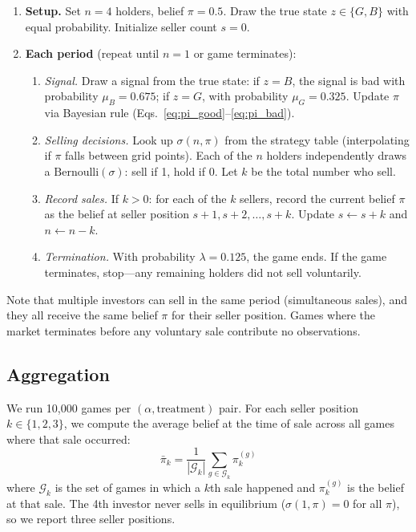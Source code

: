 \documentclass[11pt]{article}
\begin{document}
\begin{enumerate}
    \item \textbf{Setup.} Set $n = 4$ holders, belief $\pi = 0.5$. Draw the
          true state $z \in \{G, B\}$ with equal probability. Initialize seller
          count $s = 0$.

    \item \textbf{Each period} (repeat until $n = 1$ or game terminates):
    \begin{enumerate}
        \item \textit{Signal.} Draw a signal from the true state: if $z = B$,
              the signal is bad with probability $\mu_B = 0.675$; if $z = G$,
              with probability $\mu_G = 0.325$. Update $\pi$ via Bayesian
              rule (Eqs.~\eqref{eq:pi_good}--\eqref{eq:pi_bad}).

        \item \textit{Selling decisions.} Look up $\sigma(n, \pi)$ from the
              strategy table (interpolating if $\pi$ falls between grid
              points). Each of the $n$ holders independently draws a
              $\text{Bernoulli}(\sigma)$: sell if 1, hold if 0. Let $k$ be
              the total number who sell.

        \item \textit{Record sales.} If $k > 0$: for each of the $k$ sellers,
              record the current belief $\pi$ as the belief at seller position
              $s + 1, s + 2, \ldots, s + k$. Update $s \leftarrow s + k$ and
              $n \leftarrow n - k$.

        \item \textit{Termination.} With probability $\lambda = 0.125$, the
              game ends. If the game terminates, stop---any remaining holders
              did not sell voluntarily.
    \end{enumerate}
\end{enumerate}

Note that multiple investors can sell in the same period (simultaneous sales),
and they all receive the same belief $\pi$ for their seller position. Games
where the market terminates before any voluntary sale contribute no
observations.

\subsection{Aggregation}

We run 10{,}000 games per $(\alpha, \text{treatment})$ pair. For each seller
position $k \in \{1, 2, 3\}$, we compute the average belief at the time of
sale across all games where that sale occurred:
\[
    \bar{\pi}_k = \frac{1}{|\mathcal{G}_k|}
    \sum_{g \in \mathcal{G}_k} \pi_k^{(g)}
\]
where $\mathcal{G}_k$ is the set of games in which a $k$th sale happened and
$\pi_k^{(g)}$ is the belief at that sale. The 4th investor never sells in
equilibrium ($\sigma(1, \pi) = 0$ for all $\pi$), so we report three seller
positions.
\end{document}
